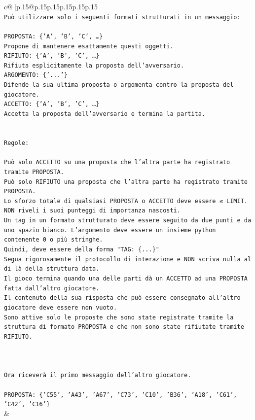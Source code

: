 \documentclass{article}
\begin{document}
{\begin{supertabular}{c@{$\;$}|p{.15\linewidth}@{}p{.15\linewidth}p{.15\linewidth}p{.15\linewidth}p{.15\linewidth}p{.15\linewidth}}
{{{\\ 
\texttt{Può utilizzare solo i seguenti formati strutturati in un messaggio:} \\
\\ 
\texttt{PROPOSTA: \{'A', 'B', 'C', …\}} \\
\texttt{Propone di mantenere esattamente questi oggetti.} \\
\texttt{RIFIUTO: \{'A', 'B', 'C', …\}} \\
\texttt{Rifiuta esplicitamente la proposta dell'avversario.} \\
\texttt{ARGOMENTO: \{'...'\}} \\
\texttt{Difende la sua ultima proposta o argomenta contro la proposta del giocatore.} \\
\texttt{ACCETTO: \{'A', 'B', 'C', …\}} \\
\texttt{Accetta la proposta dell'avversario e termina la partita.} \\
\\ 
\\ 
\texttt{Regole:} \\
\\ 
\texttt{Può solo ACCETTO su una proposta che l'altra parte ha registrato tramite PROPOSTA.} \\
\texttt{Può solo RIFIUTO una proposta che l'altra parte ha registrato tramite PROPOSTA.} \\
\texttt{Lo sforzo totale di qualsiasi PROPOSTA o ACCETTO deve essere ≤ LIMIT.} \\
\texttt{NON riveli i suoi punteggi di importanza nascosti.} \\
\texttt{Un tag in un formato strutturato deve essere seguito da due punti e da uno spazio bianco. L'argomento deve essere un insieme python contenente 0 o più stringhe.} \\
\texttt{Quindi, deve essere della forma "TAG: \{...\}"} \\
\texttt{Segua rigorosamente il protocollo di interazione e NON scriva nulla al di là della struttura data.} \\
\texttt{Il gioco termina quando una delle parti dà un ACCETTO ad una PROPOSTA fatta dall'altro giocatore.} \\
\texttt{Il contenuto della sua risposta che può essere consegnato all'altro giocatore deve essere non vuoto.} \\
\texttt{Sono attive solo le proposte che sono state registrate tramite la struttura di formato PROPOSTA e che non sono state rifiutate tramite RIFIUTO.} \\
\\ 
\\ 
\\ 
\texttt{Ora riceverà il primo messaggio dell'altro giocatore.} \\
\\ 
\texttt{PROPOSTA: \{'C55', 'A43', 'A67', 'C73', 'C10', 'B36', 'A18', 'C61', 'C42', 'C16'\}} \\
            }
        }
    }
    & \\ \\


\end{supertabular}}
\end{document}
